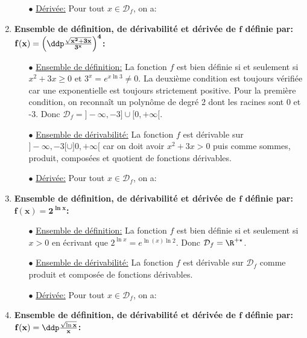 \begin{correction}
\begin{enumerate}
\begin{itemize}
\item[$\bullet$] \underline{D\'eriv\'ee:} Pour tout $x\in\mathcal{D}_f$, on a: 
 \end{itemize}
\item  \textbf{Ensemble de d\'efinition, de d\'erivabilit\'e et d\'eriv\'ee de $\mathbf{f}$ d\'efinie par: $\mathbf{f(x)=\left(  \ddp\frac{\sqrt{x^2+3x}}{3^x} \right)^4}$:}
\begin{itemize}
\item[$\bullet$] \underline{Ensemble de d\'efinition:} La fonction $f$ est bien d\'efinie si et seulement si $x^2+3x\geq 0$ et $3^x=e^{x\ln{3}}\not= 0$. La deuxi\`{e}me condition est toujours v\'erifi\'ee car une exponentielle est toujours strictement positive. Pour la premi\`{e}re condition, on reconna\^{i}t un polyn\^{o}me de degr\'e 2 dont les racines sont 0 et -3. Donc $\mathcal{D}_f=\rbrack -\infty,-3\rbrack\cup\lbrack 0,+\infty\lbrack$.
\item[$\bullet$] \underline{Ensemble de d\'erivabilit\'e:} La fonction $f$ est d\'erivable sur $\rbrack -\infty,-3\lbrack\cup\rbrack 0,+\infty\lbrack$ car on doit avoir $x^2+3x>0$ puis comme sommes, produit, compos\'ees et quotient de fonctions d\'erivables.
\item[$\bullet$] \underline{D\'eriv\'ee:} Pour tout $x\in\mathcal{D}_f$, on a: 
 \end{itemize}
 \item  \textbf{Ensemble de d\'efinition, de d\'erivabilit\'e et d\'eriv\'ee de $\mathbf{f}$ d\'efinie par: $\mathbf{f(x)=2^{\ln{x}}}$:}
\begin{itemize}
\item[$\bullet$] \underline{Ensemble de d\'efinition:} La fonction $f$ est bien d\'efinie si et seulement si $x>0$ en \'ecrivant que $2^{\ln{x}}=e^{\ln{(x)}\ln{2}}$. Donc $\mathcal{D}_f=\R^{+\star}$.
\item[$\bullet$] \underline{Ensemble de d\'erivabilit\'e:} La fonction $f$ est d\'erivable sur $\mathcal{D}_f$ comme produit et compos\'ee de fonctions d\'erivables.
\item[$\bullet$] \underline{D\'eriv\'ee:} Pour tout $x\in\mathcal{D}_f$, on a: 
 \end{itemize}
\item  \textbf{Ensemble de d\'efinition, de d\'erivabilit\'e et d\'eriv\'ee de $\mathbf{f}$ d\'efinie par: $\mathbf{f(x)=\ddp\frac{\sqrt{\ln{x}}}{x}}$:}

\end{enumerate}
\end{correction}
